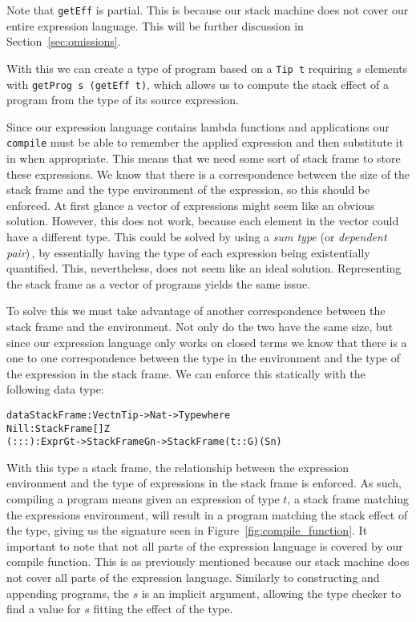 Note that \texttt{getEff} is partial. This is because our stack machine does not cover our entire expression language. This will be further discussion in Section~\ref{sec:omissions}.

With this we can create a type of program based on a \texttt{Tip t} requiring $s$ elements with \texttt{getProg s (getEff t)}, which allows us to compute the stack effect of a program from the type of its source expression.

Since our expression language contains lambda functions and applications our \texttt{compile} must be able to remember the applied expression and then substitute it in when appropriate. This means that we need some sort of stack frame to store these expressions. We know that there is a correspondence between the size of the stack frame and the type environment of the expression, so this should be enforced. At first glance a vector of expressions might seem like an obvious solution. However, this does not work, because each element in the vector could have a different type. This could be solved by using a \emph{sum type} (or \emph{dependent pair})\,\cite[p. 14]{Brady:IdrisTutorial}, by essentially having the type of each expression being existentially quantified. This, nevertheless, does not seem like an ideal solution. Representing the stack frame as a vector of programs yields the same issue.

To solve this we must take advantage of another correspondence between the stack frame and the environment. Not only do the two have the same size, but since our expression language only works on closed terms we know that there is a one to one correspondence between the type in the environment and the type of the expression in the stack frame. We can enforce this statically with the following data type:

\begin{alltt}
data StackFrame : Vect n Tip -> Nat -> Type where
	Nill : StackFrame [] Z
	(:::) : Expr G t -> StackFrame G n -> StackFrame (t :: G) (S n)
\end{alltt}

With this type a stack frame, the relationship between the expression environment and the type of expressions in the stack frame is enforced. As such, compiling a program means given an expression of type $t$, a stack frame matching the expressions environment, will result in a program matching the stack effect of the type, giving us the signature seen in Figure~\ref{fig:compile_function}. It important to note that not all parts of the expression language is covered by our compile function. This is as previously mentioned because our stack machine does not cover all parts of the expression language. Similarly to constructing and appending programs, the $s$ is an implicit argument, allowing the type checker to find a value for $s$ fitting the effect of the type.

